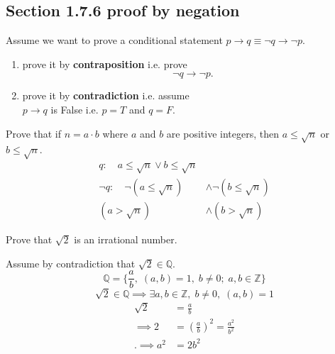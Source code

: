 \documentclass[a4paper, 12pt]{article}
\newenvironment{proof}[1][Proof]{\begin{trivlist}
\item[\hskip \labelsep {\bfseries #1}]}{\end{trivlist}}
\newenvironment{example}[1][Example]{\begin{trivlist}
\item[\hskip \labelsep {\bfseries #1}]}{\end{trivlist}}
\newcommand{\keyword}[1]{\textbf{#1}}
\newcommand{\then}{\rightarrow}
\begin{document}
    \subsection*{Section 1.7.6 proof by negation}
    Assume we want to prove a conditional statement $p \then q \equiv \neg q \then \neg p$.
    \begin{enumerate}
        \item prove it by \keyword{contraposition} i.e. prove
        \[\neg q \then \neg p.\]
        \item prove it by \keyword{contradiction} i.e. assume \\
        $p \then q$ is False i.e. $p = T$ and $q = F$.
    \end{enumerate}
    \begin{example} %
        Prove that if $n = a \cdot b$ where $a$ and $b$ are positive integers,
        then $a \le \sqrt{n}$ or $b \le \sqrt{n}$.
        \begin{align*}
            q: \quad a \le \sqrt{n} \vee b \le \sqrt{n} \\
            \neg q: \quad \neg(a \le \sqrt{n}) &\wedge \neg(b \le \sqrt{n}) \\
            (a > \sqrt{n}) &\wedge (b > \sqrt{n})
        \end{align*}
    \end{example}
    \begin{example} %
        Prove that $\sqrt{2}$ is an irrational number.
        \begin{proof}
            Assume by contradiction that $\sqrt{2} \in \mathbb{Q}$.
            \[\mathbb{Q} = \{\frac{a}{b}, \; (a, b) = 1, \; b \ne 0; \; a, b \in \mathbb{Z}\}\]
            \[\sqrt{2} \in \mathbb{Q} \implies \exists a, b \in \mathbb{Z}, \; b \ne 0, \; (a, b) = 1\]
            \begin{align*}
                \sqrt{2} &= \frac{a}{b} \\
                \implies 2 &= (\frac{a}{b})^2 = \frac{a^2}{b^2} \\.
                \implies a^2 &= 2b^2
            \end{align*}
        \end{proof}
    \end{example}
\end{document}
